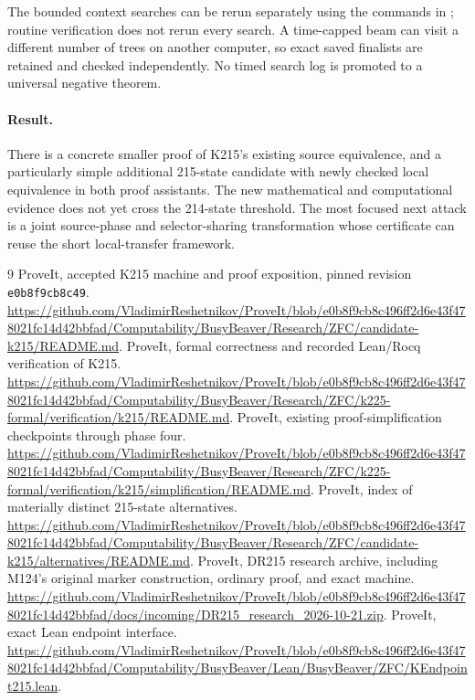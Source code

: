 \documentclass[11pt]{article}
\theoremstyle{remark}\newtheorem{remark}[theorem]{Remark}
\newcommand{\code}[1]{\texttt{\small #1}}
\begin{document}
The bounded context searches can be rerun separately using the commands in ; routine verification does not rerun every search. A time-capped beam can visit a different number of trees on another computer, so exact saved finalists are retained and checked independently. No timed search log is promoted to a universal negative theorem.

\paragraph{Result.}
There is a concrete smaller proof of K215's existing source equivalence, and a particularly simple additional 215-state candidate with newly checked local equivalence in both proof assistants. The new mathematical and computational evidence does not yet cross the 214-state threshold. The most focused next attack is a joint source-phase and selector-sharing transformation whose certificate can reuse the short local-transfer framework.

\begin{thebibliography}{9}
 ProveIt, accepted K215 machine and proof exposition, pinned revision \code{e0b8f9cb8c49}. \url{https://github.com/VladimirReshetnikov/ProveIt/blob/e0b8f9cb8c496ff2d6e43f478021fc14d42bbfad/Computability/BusyBeaver/Research/ZFC/candidate-k215/README.md}.
 ProveIt, formal correctness and recorded Lean/Rocq verification of K215. \url{https://github.com/VladimirReshetnikov/ProveIt/blob/e0b8f9cb8c496ff2d6e43f478021fc14d42bbfad/Computability/BusyBeaver/Research/ZFC/k225-formal/verification/k215/README.md}.
 ProveIt, existing proof-simplification checkpoints through phase four. \url{https://github.com/VladimirReshetnikov/ProveIt/blob/e0b8f9cb8c496ff2d6e43f478021fc14d42bbfad/Computability/BusyBeaver/Research/ZFC/k225-formal/verification/k215/simplification/README.md}.
 ProveIt, index of materially distinct 215-state alternatives. \url{https://github.com/VladimirReshetnikov/ProveIt/blob/e0b8f9cb8c496ff2d6e43f478021fc14d42bbfad/Computability/BusyBeaver/Research/ZFC/candidate-k215/alternatives/README.md}.
 ProveIt, DR215 research archive, including M124's original marker construction, ordinary proof, and exact machine. \url{https://github.com/VladimirReshetnikov/ProveIt/blob/e0b8f9cb8c496ff2d6e43f478021fc14d42bbfad/docs/incoming/DR215_research_2026-10-21.zip}.
 ProveIt, exact Lean endpoint interface. \url{https://github.com/VladimirReshetnikov/ProveIt/blob/e0b8f9cb8c496ff2d6e43f478021fc14d42bbfad/Computability/BusyBeaver/Lean/BusyBeaver/ZFC/KEndpoint215.lean}.
\end{thebibliography}
\end{document}
